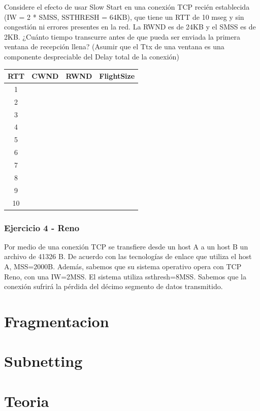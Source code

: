 \documentclass[titlepage,a4paper]{article}
\begin{document}
Considere el efecto de usar Slow Start en una conexión TCP recién establecida (IW = 2 * SMSS, SSTHRESH = 64KB), que tiene un RTT de 10 mseg y sin congestión ni errores presentes en la red. La RWND es de 24KB y el SMSS es de 2KB. ¿Cuánto tiempo transcurre antes de que pueda ser enviada la primera ventana de recepción llena? (Asumir que el Ttx de una ventana es una componente despreciable del Delay total de la conexión)


\begin{center}
    \begin{tabular}{c|c|c|c}
        RTT & CWND & RWND & FlightSize \\
        \hline
        \hline
        1 & & & \\
         \hline
        2 & & & \\
         \hline
        3 & & & \\
         \hline
        4 & & & \\
         \hline
        5 & & & \\
         \hline
        6 & & & \\
         \hline
        7 & & & \\
         \hline
        8 & & & \\
         \hline
        9 & & & \\
         \hline
        10 & & & \\
    \end{tabular}
\end{center}


\subsubsection{Ejercicio 4 - Reno}

Por medio de una conexión TCP se transfiere desde un host A a un host B un archivo de 41326 B. De acuerdo con las tecnologías de enlace que utiliza el host A, MSS=2000B. Además, sabemos que su sistema operativo opera con TCP Reno, con una IW=2MSS. El sistema utiliza ssthresh=8MSS. Sabemos que la conexión sufrirá la pérdida del décimo segmento de datos transmitido.

\section{Fragmentacion}\label{sec:fragmentacion}



\section{Subnetting}\label{sec:subnetting}




\section{Teoria}\label{sec:teoria}


\end{document}

